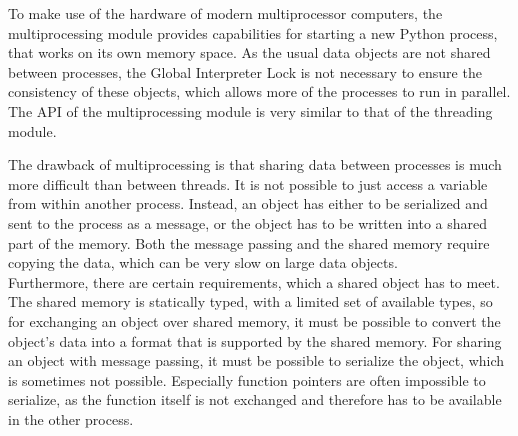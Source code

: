 		To make use of the hardware of modern multiprocessor computers, the multiprocessing module provides capabilities for starting a new Python process, that works on its own memory space.
		As the usual data objects are not shared between processes, the Global Interpreter Lock is not necessary to ensure the consistency of these objects, which allows more of the processes to run in parallel.
		The API of the multiprocessing module is very similar to that of the threading module.

		The drawback of multiprocessing is that sharing data between processes is much more difficult than between threads.
		It is not possible to just access a variable from within another process.
		Instead, an object has either to be serialized and sent to the process as a message, or the object has to be written into a shared part of the memory.
		Both the message passing and the shared memory require copying the data, which can be very slow on large data objects.\\
		Furthermore, there are certain requirements, which a shared object has to meet.
		The shared memory is statically typed, with a limited set of available types, so for exchanging an object over shared memory, it must be possible to convert the object's data into a format that is supported by the shared memory.
		For sharing an object with message passing, it must be possible to serialize the object, which is sometimes not possible.
		Especially function pointers are often impossible to serialize, as the function itself is not exchanged and therefore has to be available in the other process.

